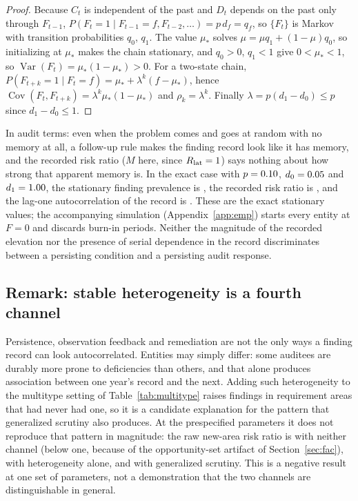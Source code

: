 \begin{proof}
Because $C_t$ is independent of the past and $D_t$ depends on the past only
through $F_{t-1}$, $P(F_t = 1 \mid F_{t-1} = f, F_{t-2}, \dots) = p\,d_f =
q_f$, so $\{F_t\}$ is Markov with transition probabilities $q_0$, $q_1$. The
value $\mu_*$ solves $\mu = \mu q_1 + (1 - \mu) q_0$, so initializing at
$\mu_*$ makes the chain stationary, and $q_0 > 0$, $q_1 < 1$ give $0 < \mu_* <
1$, so $\operatorname{Var}(F_t) = \mu_*(1 - \mu_*) > 0$. For a two-state chain,
$P(F_{t+k} = 1 \mid F_t = f) = \mu_* + \lambda^k (f - \mu_*)$, hence
$\operatorname{Cov}(F_t, F_{t+k}) = \lambda^k \mu_*(1 - \mu_*)$ and $\rho_k =
\lambda^k$. Finally $\lambda = p(d_1 - d_0) \leq p$ since $d_1 - d_0 \leq 1$.
\end{proof}

In audit terms: even when the problem comes and goes at random with no
memory at all, a follow-up rule makes the finding record look like it has
memory, and the recorded risk ratio ($M$ here, since $R_{\mathrm{lat}} = 1$) says
nothing about how strong that apparent memory is. In the exact case with
$p = 0.10{}$, $d_0 = 0.05{}$ and $d_1 = 1.00{}$, the
stationary finding prevalence is \nObsOnlyMuStar{}, the recorded risk ratio is
\nObsOnlyRR{}, and the lag-one autocorrelation of the record is
\nObsOnlyRho{}. These are the exact stationary values; the accompanying
simulation (Appendix~\ref{app:emp}) starts every entity at $F = 0$ and
discards \nObsOnlyBurn{} burn-in periods. Neither the magnitude of the recorded elevation nor
the presence of serial dependence in the record discriminates between a
persisting condition and a persisting audit response.

\subsection{Remark: stable heterogeneity is a fourth channel}

Persistence, observation feedback and remediation are not the only ways a
finding record can look autocorrelated. Entities may simply differ: some
auditees are durably more prone to deficiencies than others, and that alone
produces association between one year's record and the next. Adding such
heterogeneity to the multitype setting of Table~\ref{tab:multitype} raises
findings in requirement areas that had never had one, so it is a candidate
explanation for the pattern that generalized scrutiny also produces. At the
prespecified parameters it does not reproduce that pattern in magnitude: the
raw new-area risk ratio is \nNullCategoryRR{} with neither channel (below one,
because of the opportunity-set artifact of Section~\ref{sec:fac}),
\nFrailtyRR{} with heterogeneity alone, and \nScrutinyRR{} with generalized
scrutiny. This is a negative result at one set of parameters, not a
demonstration that the two channels are distinguishable in general.
